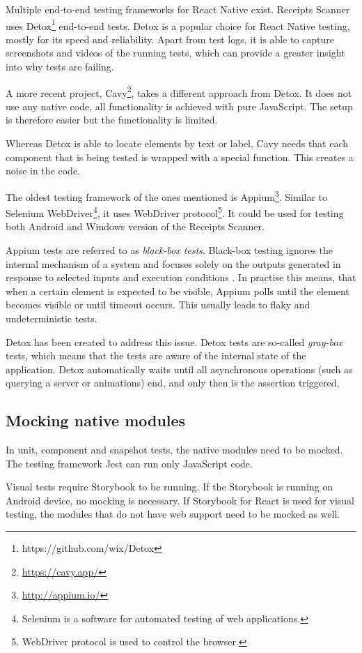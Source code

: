 \documentclass[
  digital, %
  table,   %
  oneside, %
  lof,     %
  lot,     %
]{fithesis3}
\begin{document}
Multiple end-to-end testing frameworks for React Native exist.
Receipts Scanner uses Detox\footnote{https://github.com/wix/Detox} end-to-end tests. Detox is a popular choice for React Native testing, mostly for its speed and reliability. Apart from test logs, it is able to capture screenshots and videos of the running tests, which can provide a greater insight into why tests are failing.

A more recent project, Cavy\footnote{\url{https://cavy.app/}}, takes a different approach from Detox. It does not use any native code, all functionality is achieved with pure JavaScript. The setup is therefore easier but the functionality is limited. 

Whereas Detox is able to locate elements by text or label, Cavy needs that each component that is being tested is wrapped with a special function. This creates a noise in the code.

The oldest testing framework of the ones mentioned is Appium\footnote{\url{http://appium.io/}}. Similar to Selenium WebDriver\footnote{Selenium is a software for automated testing of web applications.}, it uses WebDriver protocol\footnote{WebDriver protocol is used to control the browser.}. It could be used for testing both Android and Windows version of the Receipts Scanner.

Appium tests are referred to as \textit{black-box tests}. Black-box testing ignores the internal mechanism of a system and focuses solely on the outputs generated in response to selected inputs and execution conditions \cite{Gao2003Testing}. In practise this means, that when a certain element is expected to be visible, Appium polls until the element becomes visible or until timeout occurs. This usually leads to flaky and undeterministic tests.

Detox has been created to address this issue. Detox tests are so-called \textit{gray-box} tests, which means that the tests are aware of the internal state of the application. Detox automatically waits until all asynchronous operations (such as querying a server or animations) end, and only then is the assertion triggered.

\subsection{Mocking native modules}
In unit, component and snapshot tests, the native modules need to be mocked. The testing framework Jest can run only JavaScript code.

Visual tests require Storybook to be running. If the Storybook is running on Android device, no mocking is necessary. If Storybook for React is used for visual testing, the modules that do not have web support need to be mocked as well.
\end{document}
